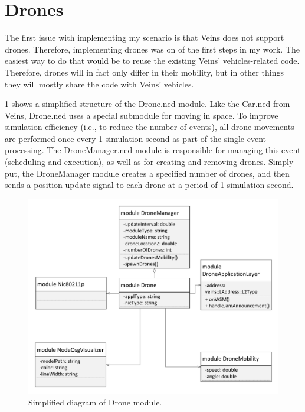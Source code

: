 \documentclass[]{nsm-thesis}
\begin{document}
\section{Drones}

The first issue with implementing my scenario is that Veins does not support drones. Therefore, implementing drones was on of the first steps in my work. The easiest way to do that would be to reuse the existing Veins' vehicles-related code. Therefore, drones will in fact only differ in their mobility, but in other things they will mostly share the code with Veins' vehicles.

\cref{fig:dronened} shows a simplified structure of the Drone.ned module. Like the Car.ned from Veins, Drone.ned uses a special submodule for moving in space. To improve simulation efficiency (i.e., to reduce the number of events), all drone movements are performed once every 1 simulation second as part of the single event processing. The DroneManager.ned module is responsible for managing this event (scheduling and execution), as well as for creating and removing drones. Simply put, the DroneManager module creates a specified number of drones, and then sends a position update signal to each drone at a period of 1 simulation second. 

\begin{figure}
	\centering
	\includegraphics[width=1\textwidth]{figures/Drone.pdf}
	\caption{Simplified diagram of Drone module.}
	\label{fig:dronened}
\end{figure}
\end{document}
